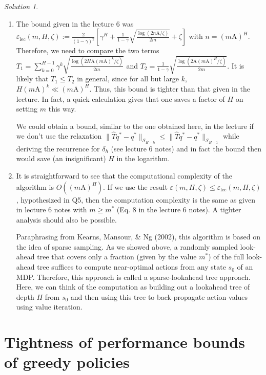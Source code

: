 \documentclass{article}
\renewcommand{\epsilon}{\varepsilon}
\DeclareMathOperator*{\1}{\mathbbm{1}}
\newcommand{\0}{\mathbf{0}}
\theoremstyle{definition}
\theoremstyle{remark}
\newtheorem*{solution*}{Solution}
\begin{document}
\begin{solution*}
\begin{enumerate}
\item The bound given in the lecture 6 was $\epsilon_\text{lec}(m,H,\zeta):=\frac{2}{(1-\gamma)^2} \left[\gamma^H + \frac{1}{1-\gamma} \sqrt{ \frac{\log\left(2n\mathrm{A}/\zeta\right)}{2m} } + \zeta \right]$ with $n = (m\mathrm{A})^H$. Therefore, we need to compare the two terms $T_1 = \sum_{k=0}^{H-1} \gamma^k \sqrt{\frac{\log(2 H \mathrm{A} (m\mathrm{A})^{k} / \zeta)}{2m}}$ and $T_2 = \frac{1}{1-\gamma} \sqrt{ \frac{\log(2\mathrm{A} (m\mathrm{A})^H /\zeta)}{2m} }$. It is likely that $T_1 \leq T_2$ in general, since for all but large $k$, $H (m\mathrm{A})^k \ll (m\mathrm{A})^H$. Thus, this bound is tighter than that given in the lecture. In fact, a quick calculation gives that one saves a factor of $H$ on setting $m$ this way.

  We could obtain a bound, similar to the one obtained here, in the lecture if we don't use the relaxation $\| \hat T q^* - q^* \|_{\mathcal{S}_{H-h}} \leq \| \hat T q^* - q^* \|_{\mathcal{S}_{H-1}}$ while deriving the recurrence for $\delta_h$  (see lecture 6 notes) and in fact the bound then would save (an insignificant) $H$ in the logarithm.

\item It is straightforward to see that the computational complexity of the algorithm is $O((m\mathrm{A})^H)$. If we use the result $\varepsilon(m, H, \zeta) \leq \epsilon_\text{lec}(m, H, \zeta)$, hypothesized in Q5, then the computation complexity is the same as given in lecture 6 notes with $m \geq m^*$ (Eq. 8 in the lecture 6 notes). A tighter analysis should also be possible.

Paraphrasing from Kearns, Mansour, \& Ng (2002), this algorithm is based on the idea of sparse sampling. As we showed above, a randomly sampled look-ahead tree that covers only a fraction (given by the value $m^*$) of the full look-ahead tree suffices to compute near-optimal actions from any state $s_0$ of an MDP. Therefore, this approach is called a sparse-lookahead tree approach. Here, we can think of the computation as building out a lookahead tree of depth $H$ from $s_0$ and then using this tree to back-propagate action-values using value iteration.
\end{enumerate}
\end{solution*}


\section*{Tightness of performance bounds of greedy policies}
\end{document}
